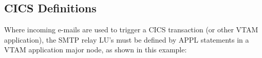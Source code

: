 \documentclass[letterpaper,10pt,english]{sphinxmanual}
\begin{document}

\ignorespaces 

\subsection{CICS Definitions}
\label{\detokenize{connectivity_guide:index-21}}\label{\detokenize{connectivity_guide:id6}}
Where incoming e-mails are used to trigger a CICS transaction (or other VTAM application), the SMTP relay LU’s must be defined by APPL statements in a VTAM application major node, as shown in this example:
\end{document}
